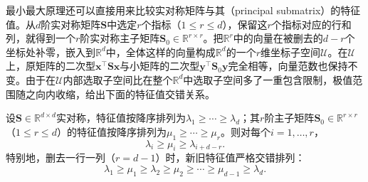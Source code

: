 最小最大原理还可以直接用来比较实对称矩阵与其（principal submatrix）的特征值。从$d$阶实对称矩阵$\bm S$中选定$r$个指标（$1\leq r\leq d$），保留这$r$个指标对应的行和列，就得到一个$r$阶实对称主子矩阵$\bm S_0\in\mathbb R^{r\times r}$。把$\mathbb R^r$中的向量在被删去的$d-r$个坐标处补零，嵌入到$\mathbb R^d$中，全体这样的向量构成$\mathbb R^d$的一个$r$维坐标子空间$\mathcal U$。在$\mathcal U$上，原矩阵的二次型$\bm x^\top\bm S\bm x$与小矩阵的二次型$\bm y^\top\bm S_0\bm y$完全相等，向量范数也保持不变。由于在$\mathcal U$内部选取子空间比在整个$\mathbb R^d$中选取子空间多了一重包含限制，极值范围随之向内收缩，给出下面的特征值交错关系。

\begin{theorem}[Cauchy交错定理]
\label{thm:ls-cauchy-interlacing}
设$\bm S\in\mathbb R^{d\times d}$实对称，特征值按降序排列为$\lambda_1\geq\cdots\geq\lambda_d$；其$r$阶主子矩阵$\bm S_0\in\mathbb R^{r\times r}$（$1\leq r\leq d$）的特征值按降序排列为$\mu_1\geq\cdots\geq\mu_r$。则对每个$i=1,\ldots,r$，
\begin{equation}
 \lambda_i\geq\mu_i\geq\lambda_{i+d-r}.
 \label{eq:ls-cauchy-interlacing}
\end{equation}
特别地，删去一行一列（$r=d-1$）时，新旧特征值严格交错排列：
\[
 \lambda_1\geq\mu_1\geq\lambda_2\geq\mu_2\geq\cdots\geq\mu_{d-1}\geq\lambda_d .
\]
\end{theorem}
